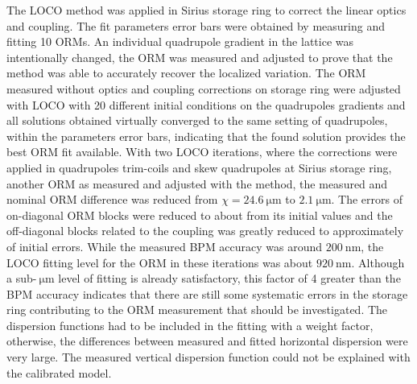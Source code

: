     The LOCO method was applied in Sirius storage ring to correct the linear optics and coupling. The fit parameters error bars were obtained by measuring and fitting 10 ORMs. An individual quadrupole gradient in the lattice was intentionally changed, the ORM was measured and adjusted to prove that the method was able to accurately recover the localized variation. The ORM measured without optics and coupling corrections on storage ring were adjusted with LOCO with 20 different initial conditions on the quadrupoles gradients and all solutions obtained virtually converged to the same setting of quadrupoles, within the parameters error bars, indicating that the found solution provides the best ORM fit available. With two LOCO iterations, where the corrections were applied in quadrupoles trim-coils and skew quadrupoles at Sirius storage ring, another ORM as measured and adjusted with the method, the measured and nominal ORM difference was reduced from $\chi = \SI{24.6}{\micro\meter}$ to $\SI{2.1}{\micro\meter}$. The errors of on-diagonal ORM blocks were reduced to about  from its initial values and the off-diagonal blocks related to the coupling was greatly reduced to approximately  of initial errors. While the measured BPM accuracy was around $\SI{200}{\nano\meter}$, the LOCO fitting level for the ORM in these iterations was about $\SI{920}{\nano\meter}$. Although a sub-$\SI{}{\micro\meter}$ level of fitting is already satisfactory, this factor of 4 greater than the BPM accuracy indicates that there are still some systematic errors in the storage ring contributing to the ORM measurement that should be investigated. The dispersion functions had to be included in the fitting with a weight factor, otherwise, the differences between measured and fitted horizontal dispersion were very large. The measured vertical dispersion function could not be explained with the calibrated model. 
    
